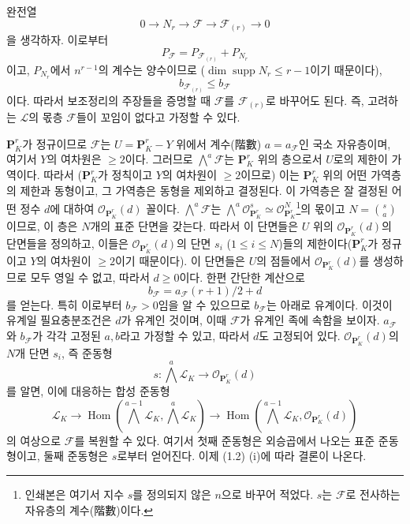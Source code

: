완전열
\[
0\longrightarrow N_r\longrightarrow\mathcal F
\longrightarrow\mathcal F_{(r)}\longrightarrow0
\]
을 생각하자. 이로부터
\[
P_{\mathcal F}=P_{\mathcal F_{(r)}}+P_{N_r}
\]
이고, $P_{N_r}$에서 $n^{r-1}$의 계수는 양수이므로
($\dim\operatorname{supp}N_r\leq r-1$이기 때문이다),
\[
b_{\mathcal F_{(r)}}\leq b_{\mathcal F}
\]
이다. 따라서 보조정리의 주장들을 증명할 때 $\mathcal F$를
$\mathcal F_{(r)}$로 바꾸어도 된다. 즉, 고려하는 $\mathcal L$의 몫층
$\mathcal F$들이 꼬임이 없다고 가정할 수 있다.

$\mathbf P^r_K$가 정규이므로 $\mathcal F$는
$U=\mathbf P^r_K-Y$ 위에서 계수(階數) $a=a_{\mathcal F}$인 국소
자유층이며, 여기서 $Y$의 여차원은 $\geq2$이다. 그러므로
$\bigwedge^a\mathcal F$는 $\mathbf P^r_K$ 위의 층으로서 $U$로의 제한이
가역이다. 따라서 ($\mathbf P^r_K$가 정칙이고 $Y$의 여차원이
$\geq2$이므로) 이는 $\mathbf P^r_K$ 위의 어떤 가역층의 제한과
동형이고, 그 가역층은 동형을 제외하고 결정된다. 이 가역층은 잘 결정된
어떤 정수 $d$에 대하여 $\mathcal O_{\mathbf P^r_K}(d)$ 꼴이다.
$\bigwedge^a\mathcal F$는
$\bigwedge^a\mathcal O_{\mathbf P^r_K}^{s}\simeq
\mathcal O_{\mathbf P^r_K}^{N}$\footnote{인쇄본은 여기서 지수 $s$를
정의되지 않은 $n$으로 바꾸어 적었다. $s$는 $\mathcal F$로 전사하는
자유층의 계수(階數)이다.}의 몫이고 $N=\binom{s}{a}$이므로, 이 층은
$N$개의 표준 단면을 갖는다. 따라서 이 단면들은 $U$ 위의
$\mathcal O_{\mathbf P^r_K}(d)$의 단면들을 정의하고, 이들은
$\mathcal O_{\mathbf P^r_K}(d)$의 단면 $s_i$ ($1\leq i\leq N$)들의
제한이다($\mathbf P^r_K$가 정규이고 $Y$의 여차원이 $\geq2$이기
때문이다). 이 단면들은 $U$의 점들에서
$\mathcal O_{\mathbf P^r_K}(d)$를 생성하므로 모두 영일 수 없고, 따라서
$d\geq0$이다. 한편 간단한 계산으로
\[
b_{\mathcal F}=a_{\mathcal F}(r+1)/2+d
\]
를 얻는다. 특히 이로부터 $b_{\mathcal F}>0$임을 알 수 있으므로
$b_{\mathcal F}$는 아래로 유계이다. 이것이 유계일 필요충분조건은 $d$가
유계인 것이며, 이때 $\mathcal F$가 유계인 족에 속함을 보이자.
$a_{\mathcal F}$와 $b_{\mathcal F}$가 각각 고정된 $a,b$라고 가정할 수
있고, 따라서 $d$도 고정되어 있다.
$\mathcal O_{\mathbf P^r_K}(d)$의 $N$개 단면 $s_i$, 즉 준동형
\[
s:\bigwedge^a\mathcal L_K\longrightarrow\mathcal O_{\mathbf P^r_K}(d)
\]
를 알면, 이에 대응하는 합성 준동형
\[
\mathcal L_K\longrightarrow
\operatorname{Hom}\!\left(\bigwedge^{a-1}\mathcal L_K,
\bigwedge^a\mathcal L_K\right)\longrightarrow
\operatorname{Hom}\!\left(\bigwedge^{a-1}\mathcal L_K,
\mathcal O_{\mathbf P^r_K}(d)\right)
\]
의 여상으로 $\mathcal F$를 복원할 수 있다. 여기서 첫째 준동형은
외승곱에서 나오는 표준 준동형이고, 둘째 준동형은 $s$로부터 얻어진다.
이제 (1.2) (i)에 따라 결론이 나온다.

